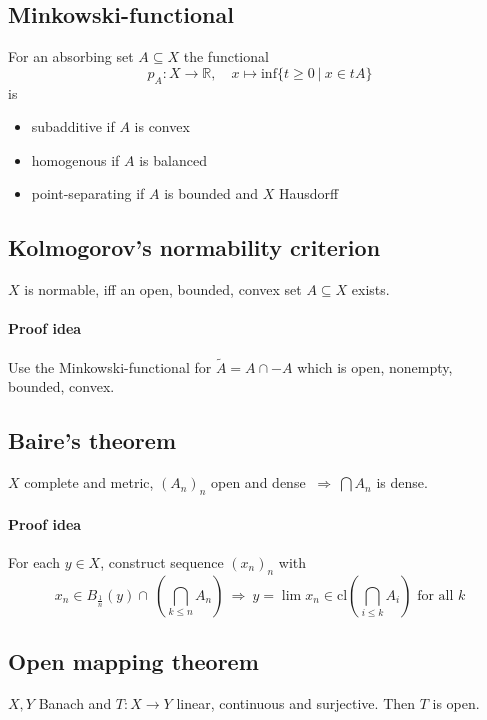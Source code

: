 \documentclass{scrartcl}
\newcommand{\R}{\mathbb{R}}
\begin{document}
\subsection{Minkowski-functional}
For an absorbing set $A \subseteq X$ the functional
\begin{equation}
    p_A: X \to \R, \quad x \mapsto \mathrm{inf}\{t \geq 0 \ | \ x \in tA \} \nonumber
\end{equation} is
\begin{itemize}
    \item subadditive if $A$ is convex
    \item homogenous if $A$ is balanced
    \item point-separating if $A$ is bounded and $X$ Hausdorff
\end{itemize}

\subsection{Kolmogorov's normability criterion}
$X$ is normable, iff an open, bounded, convex set $A \subseteq X$ exists.
\paragraph{Proof idea} Use the Minkowski-functional for $\tilde{A} = A \cap -A$ which is open, nonempty, bounded, convex.

\subsection{Baire's theorem}
$X$ complete and metric, $\left( A_n \right)_n$ open and dense $ \ \Rightarrow \ \bigcap A_n $ is dense.
\paragraph{Proof idea} For each $y \in X$, construct sequence $(x_n)_n$ with 
\begin{equation}
    x_n \in B_{\frac 1 n}(y) \cap \ \left( \bigcap_{k \leq n} A_n \right) \ \Rightarrow \ y = \lim x_n \in \mathrm{cl}\left( \bigcap_{i \leq k} A_i \right) \text{ for all } k \nonumber
\end{equation}

\subsection{Open mapping theorem}
$X, Y$ Banach and $T: X \to Y$ linear, continuous and surjective. Then $T$ is open.
\end{document}

